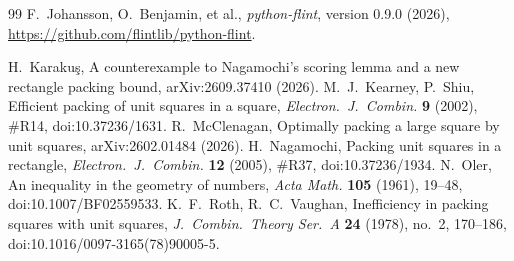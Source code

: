 \documentclass[11pt]{amsart}
\theoremstyle{definition}
\theoremstyle{remark}
\begin{document}
\begin{thebibliography}{99}
 F.~Johansson, O.~Benjamin, et al., \emph{python-flint}, version 0.9.0 (2026), \url{https://github.com/flintlib/python-flint}.

 H.~Karaku\c{s}, A counterexample to Nagamochi's scoring lemma and a new rectangle packing bound,
arXiv:2609.37410 (2026).
 M.~J.~Kearney, P.~Shiu, Efficient packing of unit squares in a square, \emph{Electron.\ J.\ Combin.} \textbf{9}
(2002), \#R14, doi:10.37236/1631.
 R.~McClenagan, Optimally packing a large square by unit squares, arXiv:2602.01484 (2026).
 H.~Nagamochi, Packing unit squares in a rectangle, \emph{Electron.\ J.\ Combin.} \textbf{12} (2005), \#R37, doi:10.37236/1934.
 N.~Oler, An inequality in the geometry of numbers, \emph{Acta Math.} \textbf{105} (1961), 19--48,
doi:10.1007/BF02559533.
 K.~F.~Roth, R.~C.~Vaughan, Inefficiency in packing squares with unit squares, \emph{J.\ Combin.\ Theory Ser.\ A}
\textbf{24} (1978), no.~2, 170--186, doi:10.1016/0097-3165(78)90005-5.
\end{thebibliography}
\end{document}
